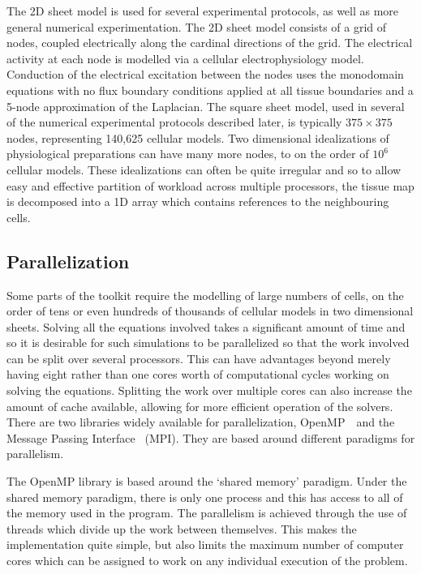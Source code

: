 The 2D sheet model is used for several experimental protocols, as well as more
general numerical experimentation.  The 2D sheet model consists of a grid of
nodes, coupled electrically along the cardinal directions of the grid.  The
electrical activity at each node is modelled via a cellular electrophysiology
model.  Conduction of the electrical excitation between the nodes uses the
monodomain equations with no flux boundary conditions applied at all tissue
boundaries and a 5-node approximation of the Laplacian.  The square sheet model,
used in several of the numerical experimental protocols described later, is
typically $375\times375$ nodes, representing 140,625 cellular models.  Two dimensional
idealizations of physiological preparations can have many more nodes, to on the
order of $10^{6}$ cellular models.  These idealizations can often be quite
irregular and so to allow easy and effective partition of workload across
multiple processors, the tissue map is decomposed into a 1D array which contains
references to the neighbouring cells.


\subsection{Parallelization}

Some parts of the toolkit require the modelling of large numbers of cells, on
the order of tens or even hundreds of thousands of cellular models in two
dimensional sheets.  Solving all the equations involved takes a significant
amount of time and so it is desirable for such simulations to be parallelized so
that the work involved can be split over several processors.  This can have
advantages beyond merely having eight rather than one cores worth of
computational cycles working on solving the equations.  Splitting the work over
multiple cores can also increase the amount of cache available, allowing for
more efficient operation of the solvers.
There are two libraries widely available for parallelization,
OpenMP~\cite{OpenMP}\ and the Message Passing Interface~\cite{MPI} (MPI).
They are based around different paradigms for parallelism.

The OpenMP library is based around the `shared memory' paradigm.
Under the shared memory paradigm, there is only one process and this has access
to all of the memory used in the program.
The parallelism is achieved through the use of threads which divide up the work
between themselves.
This makes the implementation quite simple, but also limits the maximum number
of computer cores which can be assigned to work on any individual execution of
the problem.

